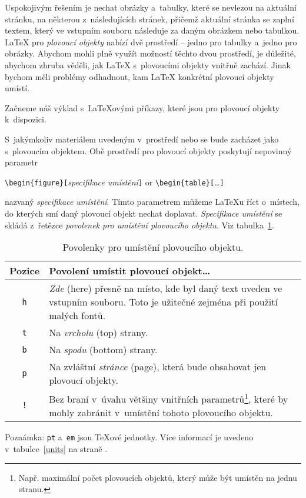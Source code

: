 Uspokojivým řešením je nechat obrázky a~tabulky, které se nevlezou
na aktuální stránku,  na některou z~následujících
stránek, přičemž aktuální stránka se zaplní textem, který ve vstupním
souboru následuje za daným obrázkem nebo tabulkou. \LaTeX{}
pro \emph{plovoucí objekty} nabízí dvě prostředí -- jedno pro tabulky
a~jedno pro obrázky. Abychom mohli plně využít možností těchto dvou
prostředí, je důležité, abychom zhruba věděli, jak \LaTeX{}
s~plovoucími objekty vnitřně zachází. Jinak bychom měli problémy
odhadnout, kam \LaTeX{} konkrétní plovoucí objekty umístí.


\bigskip
Začneme náš výklad s~\LaTeX ovými příkazy, které jsou pro plovoucí objekty
k~dispozici.

S~jakýmkoliv materiálem uvedeným v~prostředí  nebo 
se bude zacházet jako s~plovoucím objektem. Obě prostředí pro
plovoucí objekty poskytují nepovinný parametr
\begin{lscommand}
\verb|\begin{figure}[|\emph{specifikace umístění}\verb|]| or
\verb|\begin{table}[|\ldots\verb|]|
\end{lscommand}
\noindent nazvaný \emph{specifikace umístění}. Tímto parametrem
můžeme \LaTeX u říct o~místech, do kterých smí daný plovoucí objekt
nechat doplavat. \emph{Specifikace umís\-tění} se skládá z~řetězce
\emph{povolenek pro umístění plovoucího objektu}. Viz tabulka~\ref{tab:permiss}.

\begin{table}[!bp]
\caption{Povolenky pro umístění plovoucího objektu.}\label{tab:permiss}
\noindent \begin{minipage}{\textwidth}
\medskip
\begin{center}
\begin{tabular}{@{}cp{8cm}@{}}
Pozice&Povolení umístit plovoucí objekt\ldots\\
\hline
\rule{0pt}{1.05em}\texttt{h} & \emph{Zde} (here) přesně na místo, kde byl daný
  text uveden ve vstupním souboru. Toto je užitečné zejména při použití malých fontů.\\[0.3ex]
\texttt{t} & Na \emph{vrcholu} (top) strany.\\[0.3ex]
\texttt{b} & Na \emph{spodu} (bottom) strany.\\[0.3ex]
\texttt{p} & Na zvláštní \emph{stránce} (page), která bude obsahovat jen plovoucí objekty.\\[0.3ex]
\texttt{!} & Bez braní v~úvahu většiny vnitřních parametrů\footnote{Např. maximální
  počet plovoucích objektů, který může být umístěn na jednu stranu.}, které by
  mohly zabránit v~umístění tohoto plovoucího objektu.
\end{tabular}
\end{center}
Poznámka: \texttt{pt} a~\texttt{em} jsou \TeX ové jednotky. Více informací je uvedeno
v~tabulce~\ref{units} na straně \pageref{units}.
\end{minipage}
\end{table}

